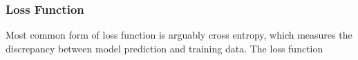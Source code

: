 \subsubsection{Loss Function}

Most common form of loss function is arguably cross entropy, which measures the discrepancy between model prediction and training data. The loss function 